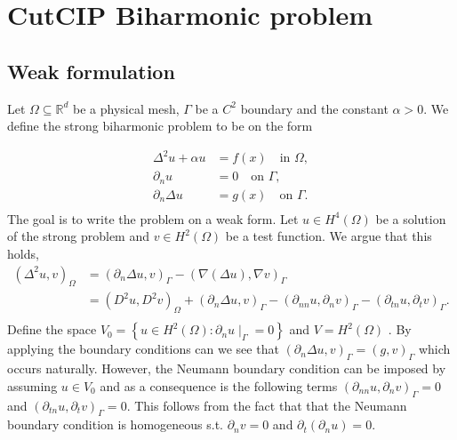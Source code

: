 
\newpage
\section{CutCIP Biharmonic problem}%
\label{sec:cutcip_biharmonic_problem}

\subsection{Weak formulation}%
\label{sub:weak_formulation}


Let $\Omega \subseteq    \mathbb{R} ^d$ be a physical mesh, $\Gamma  $ be a $C^2$ boundary and the constant $\alpha >0$. We define the strong biharmonic problem to be on the form

\begin{equation}
\begin{split}
    \Delta^2  u  + \alpha  u  & = f( x)  \quad \text{in } \Omega,   \\
    \partial _{n} u & = 0  \quad \text{on } \Gamma ,  \\
    \partial _{n} \Delta  u & = g(x)  \quad \text{on } \Gamma  .  \\
\end{split}
\end{equation}
The goal is to write the problem on a weak form.
Let $u \in H^{4}( \Omega ) $ be a solution of the strong problem and $v \in H^{2}( \Omega ) $ be a test function. We argue that this holds,
    \[
        \begin{split}
(\Delta ^2u,v )_{\Omega } & = ( \partial _{n} \Delta u, v)_{\Gamma } - ( \nabla ( \Delta u) , \nabla v) _{\Gamma } \\
&= ( D^2u, D^2v)_{\Omega } + ( \partial _{n} \Delta u ,v)_{\Gamma } - ( \partial _{nn} u, \partial _{n}v)_{\Gamma } - ( \partial _{tn} u, \partial _{t} v)_{\Gamma }.        \\
        \end{split}
    \]
    Define the space $V_{0} = \left\{ u \in H^{2}( \Omega ) :  \partial _{n}u  \mid _{\Gamma } = 0 \right \} $ and $V = H^2( \Omega ) $ .
    By applying the boundary conditions can we see that $( \partial _{n} \Delta u, v)_\Gamma   = ( g,v)_{\Gamma }$ which occurs naturally. However, the Neumann boundary condition can be imposed by assuming $u \in V_{0}$ and
     as a consequence is the following terms $ ( \partial _{nn} u, \partial _{n}v)_{\Gamma }
    = 0$   and $( \partial _{tn} u, \partial _{t}v)_{\Gamma } = 0$. This follows from the fact that that the Neumann boundary condition is homogeneous s.t. $\partial _{n} v = 0$ and $\partial _{t} (\partial _{n}u) = 0 $.

